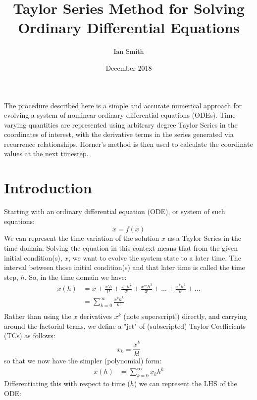 \documentclass[11pt]{article}
\title{\textbf{Taylor Series Method for Solving Ordinary Differential Equations}}
\author{Ian Smith}
\date{December 2018}
\begin{document}
\maketitle

\abstract
The procedure described here is a simple and accurate numerical approach for evolving a system of nonlinear ordinary differential equations (ODEs).
Time varying quantities are represented using arbitrary degree Taylor Series in the coordinates of interest, with the derivative terms in the series generated via recurrence relationships.
Horner's method is then used to calculate the coordinate values at the next timestep. 

\section{Introduction}
Starting with an ordinary differential equation (ODE), or system of such equations:
\begin{equation}
\dot{x} = f(x)
\end{equation}
We can represent the time variation of the solution $x$ as a Taylor Series in the time domain.
Solving the equation in this context means that from the given initial condition(s), $x$, we want to evolve the system state to a later time.
The interval between those initial condition(s) and that later time is called the time step, $h$.
So, in the time domain we have:
\begin{equation}
\begin{aligned}
x(h) &= x + \frac{x'h}{1!} + \frac{x''h^2}{2!} + \frac{x'''h^3}{3!} + ... + \frac{x^kh^k}{k!} + ...\\
&= \sum_{k=0}^{\infty} \frac{x^kh^k}{k!}\\
\end{aligned}
\end{equation}
Rather than using the $x$ derivatives $x^k$ (note superscript!) directly, and carrying around the factorial terms, we define a "jet" of (subscripted) Taylor Coefficients (TCs) as follows:
\begin{equation}
x_k = \frac{x^k}{k!}
\end{equation}
so that we now have the simpler (polynomial) form:
\begin{equation}
\begin{aligned}
x(h) &= \sum_{k=0}^{\infty} x_kh^k
\end{aligned}
\end{equation}
Differentiating this with respect to time ($h$) we can represent the LHS of the ODE:
\end{document}
